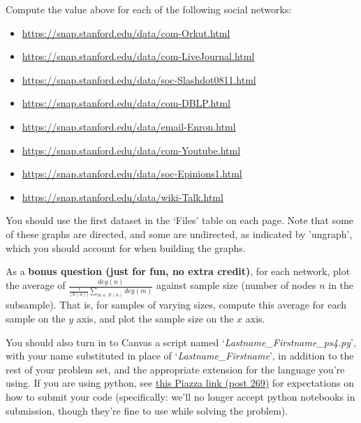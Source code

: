 \documentclass[11pt]{article}
\theoremstyle{definition} \newtheorem{Theorem}{theorem}
\begin{document}
Compute the value above for each of the following social networks: \begin{itemize}
\item \href{https://snap.stanford.edu/data/com-Orkut.html}{https://snap.stanford.edu/data/com-Orkut.html}
\item \href{https://snap.stanford.edu/data/com-LiveJournal.html}{https://snap.stanford.edu/data/com-LiveJournal.html}
\item \href{https://snap.stanford.edu/data/soc-Slashdot0811.html}{https://snap.stanford.edu/data/soc-Slashdot0811.html}
\item \href{https://snap.stanford.edu/data/com-DBLP.html}{https://snap.stanford.edu/data/com-DBLP.html}
\item \href{https://snap.stanford.edu/data/email-Enron.html}{https://snap.stanford.edu/data/email-Enron.html}
\item \href{https://snap.stanford.edu/data/com-Youtube.html}{https://snap.stanford.edu/data/com-Youtube.html}
\item \href{https://snap.stanford.edu/data/soc-Epinions1.html}{https://snap.stanford.edu/data/soc-Epinions1.html}
\item \href{https://snap.stanford.edu/data/wiki-Talk.html}{https://snap.stanford.edu/data/wiki-Talk.html}
\end{itemize}

You should use the first dataset in the `Files' table on each page. Note that some of these graphs are directed, and some are undirected, as indicated by 'ungraph', which you should account for when building the graphs.

As a \textbf{bonus question (just for fun, no extra credit)}, for each network, plot the average of $\frac{deg(n)}{\frac{1}{|N(n)|}\sum\limits_{m \in N(n)} deg(m)}$ against sample size (number of nodes $n$ in the subsample). That is, for samples of varying sizes, compute this average for each sample on the $y$ axis, and plot the sample size on the $x$ axis.

You should also turn in to Canvas a script named `\textit{Lastname\_Firstname\_ps4.py}', with your name substituted in place of `\textit{Lastname\_Firstname}', in addition to the rest of your problem set, and the appropriate extension for the language you're using. If you are using python, see \href{https://piazza.com/class/iy4iludwvo851z?cid=269}{this Piazza link (post 269)} for expectations on how to submit your code (specifically: we'll no longer accept python notebooks in submission, though they're fine to use while solving the problem).
\end{document}
